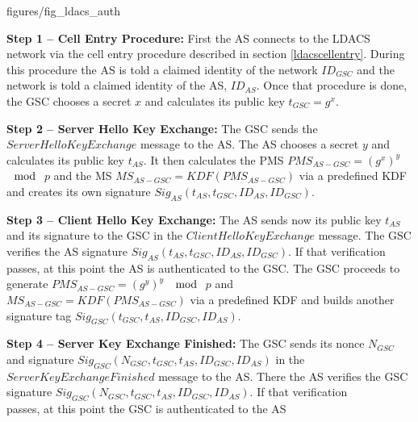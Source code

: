  {figures/fig_ldacs_auth}
\vspace{0.5em}

\vspace{0.5em}
\textbf{Step 1 -- Cell Entry Procedure:} First the \ac{AS} connects to the \ac{LDACS} network via the cell entry procedure described in section \ref{ldacscellentry}. During this procedure the \ac{AS} is told a claimed identity of the network $ID_{GSC}$ and the network is told a claimed identity of the \ac{AS}, $ID_{AS}.$ Once that procedure is done, the \ac{GSC} chooses a secret $x$ and calculates its public key $t_{GSC} = g^x$.

\vspace{0.5em}
\textbf{Step 2 -- Server Hello Key Exchange:}  The \ac{GSC} sends the 
\\$ServerHelloKeyExchange$ message to the \ac{AS}. The \ac{AS} chooses a secret $y$ and calculates its public key $t_{AS}$. It then calculates the \ac{PMS} $\mathit{PMS}_{AS-GSC} = (g^x)^y$ $\mod$ $p$ and the \ac{MS} $\mathit{MS}_{AS-GSC}=\mathit{KDF}(PMS_{AS-GSC})$ via a predefined \ac{KDF} and creates its own signature $Sig_{AS}(t_{AS}, t_{GSC}, \mathit{ID}_{AS}, \mathit{ID}_{GSC})$.

\vspace{0.5em}
\textbf{Step 3 -- Client Hello Key Exchange:} The \ac{AS} sends now its public key $t_{AS}$ and its signature to the \ac{GSC} in the $ClientHelloKeyExchange$ message. The \ac{GSC} verifies the AS signature $Sig_{AS}(t_{AS}, t_{GSC}, \mathit{ID}_{AS}, \mathit{ID}_{GSC})$. If that verification passes, at this point the \ac{AS} is authenticated to the \ac{GSC}. The \ac{GSC} proceeds to generate  $\mathit{PMS}_{AS-GSC} = (g^y)^y$ $\mod$ $p$ and $MS_{AS-GSC} = \mathit{KDF}(\mathit{PMS}_{AS-GSC})$  via a predefined \ac{KDF} and builds another signature tag $Sig_{GSC}(t_{GSC}, t_{AS}, \mathit{ID}_{GSC}, \mathit{ID}_{AS})$.

\vspace{0.5em}
\textbf{Step 4 -- Server Key Exchange Finished:} The \ac{GSC} sends its nonce $N_{GSC}$ and signature $Sig_{GSC}(N_{GSC}, t_{GSC}, t_{AS}, \mathit{ID}_{GSC}, \mathit{ID}_{AS})$ in the 
\\$ServerKeyExchangeFinished$ message to the \ac{AS}. There the \ac{AS} verifies the \ac{GSC} signature $Sig_{GSC}(N_{GSC}, t_{GSC}, t_{AS}, \mathit{ID}_{GSC}, \mathit{ID}_{AS})$. If that verification \\ passes, at this point the \ac{GSC} is authenticated to the \ac{AS}

